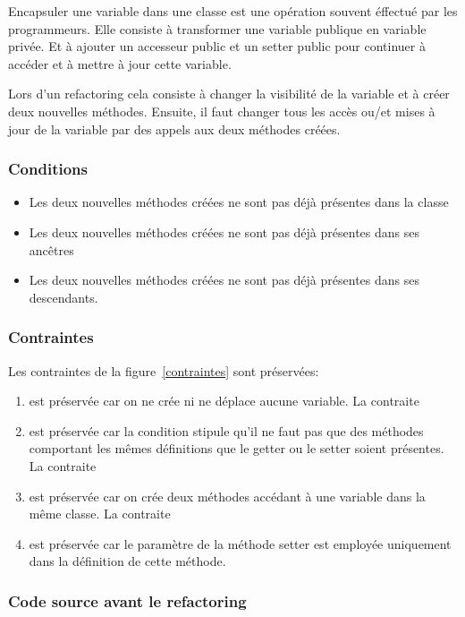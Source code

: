 \documentclass[a4paper, 12pt]{article}
\begin{document}
  Encapsuler une variable dans une classe est une opération souvent éffectué par les programmeurs.
  Elle consiste à transformer une variable publique en variable privée.
  Et à ajouter un accesseur public et un setter public pour continuer à accéder et à mettre à jour cette variable.

  Lors d'un refactoring cela consiste à changer la visibilité de la variable et à créer deux nouvelles méthodes.
  Ensuite, il faut changer tous les accès ou/et mises à jour de la variable par des appels aux deux méthodes créées.

  \subsubsection{Conditions}

  \begin{itemize}[label=\textbullet]
    \item Les deux nouvelles méthodes créées ne sont pas déjà présentes dans la classe
    \item Les deux nouvelles méthodes créées ne sont pas déjà présentes dans ses ancêtres
    \item Les deux nouvelles méthodes créées ne sont pas déjà présentes dans ses descendants.
  \end{itemize}

  \subsubsection{Contraintes}

  Les contraintes de la figure~\ref{contraintes} sont préservées:
  \begin{enumerate}
    La contraite \item est préservée car on ne crée ni ne déplace aucune variable.
    La contraite \item est préservée car la condition stipule qu'il ne faut pas que des méthodes comportant les mêmes définitions que le getter ou le setter soient présentes.
    La contraite \item est préservée car on crée deux méthodes accédant à une variable dans la même classe.
    La contraite \item est préservée car le paramètre de la méthode setter est employée uniquement dans la définition de cette méthode.
  \end{enumerate}

  \subsubsection{Code source avant le refactoring}
\end{document}
